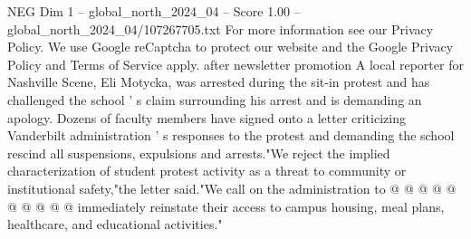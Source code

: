 \begin{textsample}{NEG Dim 1 – global\_north\_2024\_04 – Score 1.00 – global\_north\_2024\_04/107267705.txt}
For more information see our Privacy Policy.
We use Google reCaptcha to protect our website and the Google Privacy Policy and Terms of Service apply. after newsletter promotion A local reporter for Nashville Scene, Eli Motycka, was arrested during the sit-in protest and has challenged the school ' s claim surrounding his arrest and is demanding an apology.
Dozens of faculty members have signed onto a letter criticizing Vanderbilt administration ' s responses to the protest and demanding the school rescind all suspensions, expulsions and arrests."We reject the implied characterization of student protest activity as a threat to community or institutional safety,"the letter said."We call on the administration to @ @ @ @ @ @ @ @ @ @ immediately reinstate their access to campus housing, meal plans, healthcare, and educational activities."

\end{textsample}
